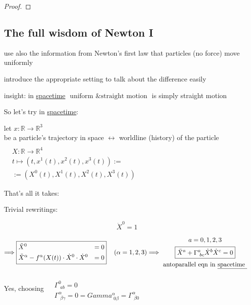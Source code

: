 \documentclass[10pt, twoside]{amsart}
\begin{document}
\begin{multicols*}{2}
\begin{proof}
\end{proof}

\subsection{The full wisdom of Newton I}

use also the information from Newton's first law that particles (no force) move uniformly 

introduce the appropriate setting to talk about the difference easily

insight: in \underline{spacetime} $\boxed{ \text{ uniform \& straight motion }}$ is simply straight motion

So let's try in \underline{spacetime}: 

let $x: \mathbb{R} \to \mathbb{R}^3$ \\
\phantom{\quad } be a particle's trajectory in space $\longleftrightarrow $ worldline (history) of the particle $\begin{aligned} & \quad \\
  & X : \mathbb{R} \to \mathbb{R}^4  \\
  & t\mapsto (t, x^1(t), x^2(t),x^3(t)) := \\
  & := (X^0(t), X^1(t),X^2(t),X^3(t)) \end{aligned}$

That's all it takes:

Trivial rewritings:

\[
\dot{X}^0 =1
\]

\[
\Longrightarrow \boxed{ \begin{aligned}
  & \ddot{X}^0 & = 0 \\ 
  & \ddot{X}^{\alpha} - f^{\alpha}(X(t))\cdot \dot{X}^0 \cdot \dot{X}^0 & =0 
\end{aligned} } \quad \, (\alpha = 1,2,3)  \Longrightarrow \begin{gathered}
  a = 0,1,2,3 \\
  \boxed{ \ddot{X}^a + \Gamma^a_{ \, \, bc}\dot{X}^b \dot{X}^c = 0 } \\
  \text{ antoparallel eqn in \underline{spacetime } }
\end{gathered}
\]

Yes, choosing $\begin{aligned} & \quad \\
  & \Gamma^0_{ \, \, ab} = 0 \\
  & \Gamma^{\alpha}_{ \, \, \beta \gamma} = 0 =Gamma^{\alpha}_{\,\, 0\beta} = \Gamma^{\alpha}_{ \, \, \beta 0}\end{aligned}$


\end{multicols*}
\end{document}
